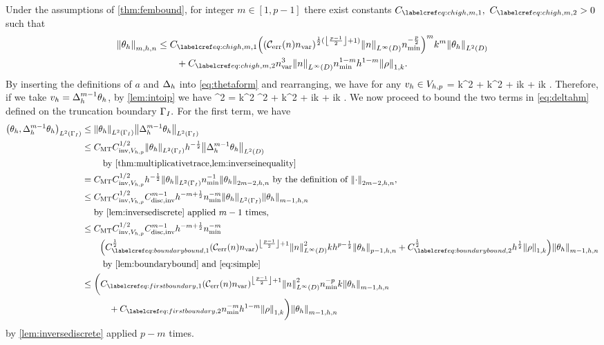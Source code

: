 \label{lem:higherbound}
Under the assumptions of \cref{thm:fembound}, for integer $m \in [1,p-1]$ there exist constants $\Chighmo,$ $\Chighmt > 0$ such that
\begin{align}
\Nfn{m,h,n}{\thetah} &\leq \Chighmo \mleft(\mleft(\En\nvar\mright)^{\half(\floor{\frac{p-1}2}+1)}\NLiD{n}\nmin^{-\frac{p}2}\mright)^mk^m \NLtD{\thetah}\nonumber\\
&\quad\quad+ \Chighmt \nvar^3\NLiD{n}\nmin^{1-m} h^{1-m} \NW{\rho}.\label{eq:chigh}
\end{align}
\ele
{}
By inserting the definitions of $a$ and $\Delta_{h}$ into \cref{eq:thetaform} and rearranging, we have for any $v_{h} \in V_{h,p}$
\beqs
\IPLtDn{\Deltah \thetah}{\vh} = k^2 \IPLtDn{\thetah}{\vh} + k^2\IPLtDn{\Qhn \rho}{\vh} + ik \IPLtGI{\thetah}{\vh} + ik \IPLtGI{\rho}{\vh}.
\eeqs
Therefore, if we take $v_{h} = \Delta_{h}^{m-1}\theta_{h}$, by \cref{lem:intoip} we have
\beq\label{eq:deltahm}
^2 = k^2 ^2 + k^2  + ik + ik .
\eeq
We now proceed to bound the two terms in \cref{eq:deltahm} defined on the truncation boundary $\Gamma_{I}.$ For the first term, we have
\begin{align}
\IPLtGI{\thetah}{\Deltah^{m-1}\thetah} &\leq \NLtGI{\thetah}\NLtGI{\Deltah^{m-1}\thetah}\nonumber\\
&\leq \CMT \CinvVhp^{1/2} \NLtGI{\thetah} h^{-\half} \NLtD{\Deltah^{m-1} \thetah}\nonumber\\
&\quad\quad\text{ by \cref{thm:multiplicativetrace,lem:inverseinequality}}\nonumber\\
&= \CMT \CinvVhp^{1/2} h^{-\half}\NLtGI{\thetah}\nmin^{-1}\Nfn{2m-2,h,n}{\thetah}\text{ by the definition of }\Nfn{2m-2,h,n}{\cdot},\nonumber\\
&\leq \CMT \CinvVhp^{1/2} \Chinv^{m-1} h^{-m+\half} \nmin^{-m} \NLtGI{\thetah}\Nfn{m-1,h,n}{\thetah}\nonumber\\
&\quad\text{ by \cref{lem:inversediscrete} applied } m-1 \text{ times,}\label{eq:useitagain}\\
&\leq \CMT \CinvVhp^{1/2} \Chinv^{m-1} h^{-m+\half} \nmin^{-m}\nonumber\\
&\quad\quad\mleft(\Cboundaryo^{\half} \mleft(\En\nvar\mright)^{\floor{\frac{p-1}2}+1}\NLiD{n}^2 k h^{p-\half} \Nfn{p-1,h,n}{\thetah} + \Cboundaryt^{\half} h^{\half} \NW{\rho}\mright)\Nfn{m-1,h,n}{\thetah}\nonumber\\
&\quad\quad\text{ by \cref{lem:boundarybound} and \cref{eq:simple}}\nonumber\\
&\leq \bigg(\CBo \mleft(\En\nvar\mright)^{\floor{\frac{p-1}2}+1}\NLiD{n}^2\nmin^{-p}k \Nfn{m-1,h,n}{\thetah}\nonumber\\
&\quad\quad\quad+ \CBt \nmin^{-m}h^{1-m} \NW{\rho}\bigg)\Nfn{m-1,h,n}{\thetah}\label{eq:firstboundary}
\end{align}
by \cref{lem:inversediscrete} applied $p-m$ times.

